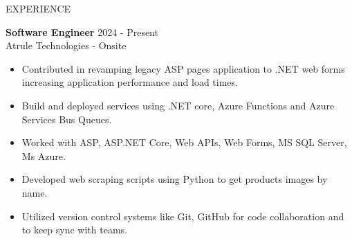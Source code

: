 \documentclass{resume} %
\begin{document}


\begin{rSection}{EXPERIENCE}
	
	\textbf{Software Engineer} \hfill 2024 - Present\\
	Atrule Technologies - Onsite %
	\begin{itemize}
		\itemsep -3pt {} 
		\item Contributed in revamping legacy ASP pages application to .NET web forms increasing application performance and load times.
		\item Build and deployed services using .NET core, Azure Functions and Azure Services Bus Queues.
		\item Worked with ASP, ASP.NET Core, Web APIs, Web Forms, MS SQL Server, Ms Azure.
		
		\item Developed web scraping scripts using Python to get products images by name.
		\item Utilized version control systems like Git, GitHub for code collaboration and to keep sync with teams.
		

\end{itemize}
\end{rSection}
\end{document}
